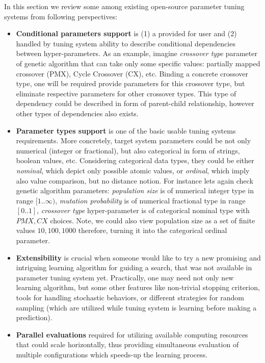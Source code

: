 In this section we review some among existing open-source parameter tuning systems from following perspectives:
\begin{itemize}
	\item \textbf{Conditional parameters support} is (1) a provided for user and (2) handled by tuning system ability to describe conditional dependencies between hyper-parameters. As an example, imagine \emph{crossover type} parameter of genetic algorithm that can take only some specific values: partially mapped crossover (PMX), Cycle Crossover (CX), etc. Binding a concrete crossover type, one will be required provide parameters for this crossover type, but eliminate respective parameters for other crossover types. This type of dependency could be described in form of parent-child relationship, however other types of dependencies also exists.
	
	\item \textbf{Parameter types support} is one of the basic usable tuning systems requirements. More concretely, target system parameters could be not only numerical (integer or fractional), but also categorical in form of strings, boolean values, etc. Considering categorical data types, they could be either \emph{nominal}, which depict only possible atomic values, or \emph{ordinal}, which imply also value comparison, but no distance notion. For instance lets again check genetic algorithm parameters: \emph{population size} is of numerical integer type in range $[1..\infty)$, \emph{mutation probability} is of numerical fractional type in range $[0..1]$, \emph{crossover type} hyper-parameter is of categorical nominal type with ${PMX, CX}$ choices. Note, we could also view population size as a set of finite values ${10, 100, 1000}$ therefore, turning it into the categorical ordinal parameter.
	
	\item \textbf{Extensibility} is crucial when someone would like to try a new promising and intriguing learning algorithm for guiding a search, that was not available in parameter tuning system yet. Practically, one may need not only new learning algorithm, but some other features like non-trivial stopping criterion, tools for handling stochastic behaviors, or different strategies for random sampling (which are utilized while tuning system is learning before making a prediction).
	
	\item \textbf{Parallel evaluations} required for utilizing available computing resources that could scale horizontally, thus providing simultaneous evaluation of multiple configurations which speeds-up the learning process.
\end{itemize}

